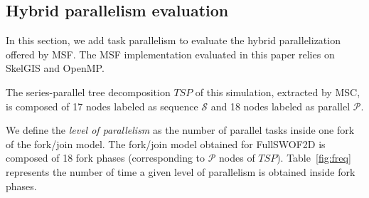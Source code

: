 %
%

\subsection{Hybrid parallelism evaluation}

In this section, we add task parallelism to evaluate the hybrid parallelization offered by MSF. The MSF implementation evaluated in this paper relies on SkelGIS and OpenMP.

The series-parallel tree decomposition $TSP$ of this simulation, extracted by MSC, is composed of 17 nodes labeled as sequence $\mathcal{S}$ and 18 nodes labeled as parallel $\mathcal{P}$. 

We define the \emph{level of parallelism} as the number of parallel tasks inside one fork of the fork/join model. The fork/join model obtained for FullSWOF2D is composed of 18 fork phases (corresponding to $\mathcal{P}$ nodes of $TSP$). Table~\ref{fig:freq} represents the number of time a given level of parallelism is obtained inside fork phases.

